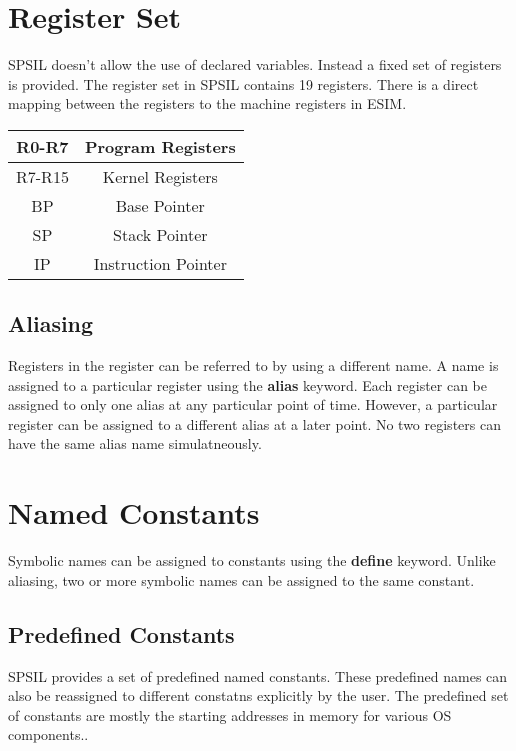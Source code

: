 \documentclass[11pt]{article}
\begin{document}
\section{Register Set}

SPSIL doesn't allow the use of declared variables. Instead a fixed set of registers is provided. The register set in SPSIL contains 19 registers. There is a direct mapping between the registers to the machine registers in ESIM.   \\

\begin{tabular}{| c | c | }
\hline
R0-R7 & Program Registers \\
\hline
R7-R15 & Kernel Registers \\
\hline
BP 		& Base Pointer \\
\hline
SP		& Stack Pointer \\
\hline
IP		& Instruction Pointer \\
\hline
\end{tabular}


\subsection{Aliasing}
Registers in the register can be referred to by using a different name. A name is assigned to a particular register using the \textbf{alias} keyword. Each register can be assigned to only one alias at any particular point of time. However, a particular register can be assigned to a different alias at a later point. No two registers can have the same alias name simulatneously.



\section{Named Constants}
Symbolic names can be assigned to constants using the \textbf{define} keyword. Unlike aliasing, two or more symbolic names can be assigned to the same constant. 
\subsection{Predefined Constants}
SPSIL provides a set of predefined named constants. These predefined names can also be reassigned to different constatns explicitly by the user. The predefined set of constants are mostly the starting addresses in memory for various OS components..
\end{document}
